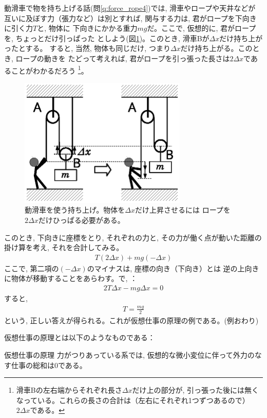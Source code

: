 \begin{exmpl}
動滑車で物を持ち上げる話(問\ref{q:force_rope4})では, 滑車やロープや天井などが
互いに及ぼす力（張力など）は別とすれば, 関与する力は, 君がロープを下向きに引く力$T$と, 物体に
下向きにかかる重力$mg$だ。ここで, 仮想的に, 君がロープを, ちょっとだけ引っぱった
としよう(図\ref{fig:string4vw})。このとき, 滑車Bが$\Delta x$だけ持ち上がったとする。
すると, 当然, 物体も同じだけ, つまり$\Delta x$だけ持ち上がる。このとき, ロープの動きを
たどって考えれば, 君がロープを引っ張った長さは$2\Delta x$であることがわかるだろう
\footnote{滑車Bの左右端からそれぞれ長さ$\Delta x$だけ上の部分が, 
引っ張った後には無くなっている。これらの長さの合計は（左右にそれぞれ1つずつあるので）
$2\Delta x$である。}。
\begin{figure}[h]
    \centering
    \includegraphics[width=8cm]{string4vw.eps}
    \caption{動滑車を使う持ち上げ。物体を$\Delta x$だけ上昇させるには
ロープを$2\Delta x$だけひっぱる必要がある。}\label{fig:string4vw}
\end{figure}

このとき, 下向きに座標をとり, それぞれの力と, その力が働く点が動いた距離の
掛け算を考え, それを合計してみる。
\begin{eqnarray}
T(2\Delta x) + mg (-\Delta x)
\end{eqnarray}
ここで, 第二項の$(-\Delta x)$のマイナスは, 座標の向き（下向き）とは
逆の上向きに物体が移動することをあらわす。で, \underline{}：
\begin{eqnarray}
2T\Delta x - mg \Delta x=0
\end{eqnarray}
すると, 
\begin{eqnarray}
T=\frac{mg}{2}
\end{eqnarray}
という, 正しい答えが得られる。これが仮想仕事の原理の例である。(例おわり)
\end{exmpl}

仮想仕事の原理とは以下のようなものである：
\begin{itembox}{仮想仕事の原理}
力がつりあっている系では, 仮想的な微小変位に伴って外力のなす仕事の総和は0である。
\end{itembox}

